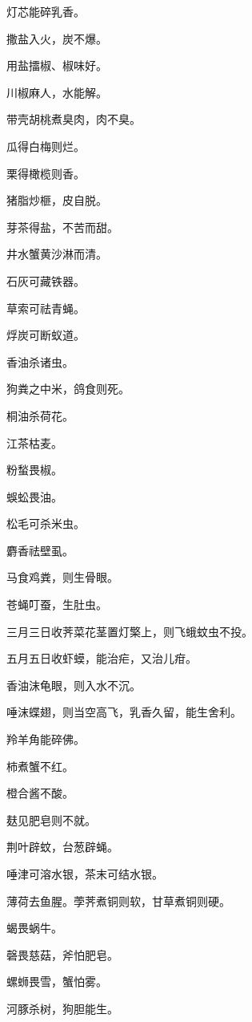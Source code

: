 \documentclass[a4paper,12pt,UTF8,twoside]{ctexbook}
\begin{document}
    灯芯能碎乳香。
    
    撒盐入火，炭不爆。
    
    用盐擂椒、椒味好。
    
    川椒麻人，水能解。
    
    带壳胡桃煮臭肉，肉不臭。
    
    瓜得白梅则烂。
    
    栗得橄榄则香。
    
    猪脂炒榧，皮自脱。
    
    芽茶得盐，不苦而甜。
    
    井水蟹黄沙淋而清。
    
    石灰可藏铁器。
    
    草索可祛青蝇。
    
    烰炭可断蚁道。
    
    香油杀诸虫。
    
    狗粪之中米，鸽食则死。
    
    桐油杀荷花。
    
    江茶枯麦。
    
    粉蝵畏椒。
    
    蜈蚣畏油。
    
    松毛可杀米虫。
    
    麝香祛壁虱。
    
    马食鸡粪，则生骨眼。
    
    苍蝇叮蚕，生肚虫。
    
    三月三日收荠菜花茎置灯檠上，则飞蛾蚊虫不投。
    
    五月五日收虾蟆，能治疟，又治儿疳。
    
    香油沫龟眼，则入水不沉。
    
    唾沫蝶翅，则当空高飞，乳香久留，能生舍利。
    
    羚羊角能碎佛。
    
    柿煮蟹不红。
    
    橙合酱不酸。
    
    麸见肥皂则不就。
    
    荆叶辟蚊，台葱辟蝇。
    
    唾津可溶水银，茶末可结水银。
    
    薄荷去鱼腥。荸荠煮铜则软，甘草煮铜则硬。
    
    蝎畏蜗牛。
    
    磬畏慈菇，斧怕肥皂。
    
    螺蛳畏雪，蟹怕雾。
    
    河豚杀树，狗胆能生。
    
\end{document}
